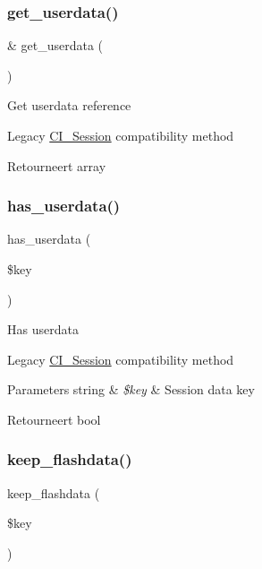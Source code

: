 \subsubsection{\texorpdfstring{get\_userdata()}{get\_userdata()}}
{\footnotesize\ttfamily \& get\+\_\+userdata (\begin{DoxyParamCaption}{ }\end{DoxyParamCaption})}

Get userdata reference

Legacy \mbox{\hyperlink{class_c_i___session}{C\+I\+\_\+\+Session}} compatibility method

\begin{DoxyReturn}{Retourneert}
array 
\end{DoxyReturn}
\mbox{\label{class_c_i___session_a25f39652bb0f716817e5e1e778729bea}} 
\subsubsection{\texorpdfstring{has\_userdata()}{has\_userdata()}}
{\footnotesize\ttfamily has\+\_\+userdata (\begin{DoxyParamCaption}\item[{}]{\$key }\end{DoxyParamCaption})}

Has userdata

Legacy \mbox{\hyperlink{class_c_i___session}{C\+I\+\_\+\+Session}} compatibility method


\begin{DoxyParams}[1]{Parameters}
string & {\em \$key} & Session data key \\
\hline
\end{DoxyParams}
\begin{DoxyReturn}{Retourneert}
bool 
\end{DoxyReturn}
\mbox{\label{class_c_i___session_a1e25514ba8dbd132db06cbedc6412158}} 
\subsubsection{\texorpdfstring{keep\_flashdata()}{keep\_flashdata()}}
{\footnotesize\ttfamily keep\+\_\+flashdata (\begin{DoxyParamCaption}\item[{}]{\$key }\end{DoxyParamCaption})}

